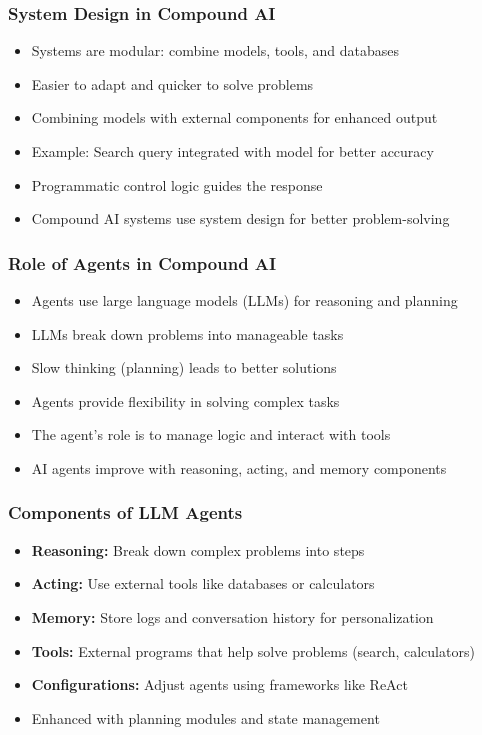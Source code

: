 \begin{frame}[fragile]\frametitle{System Design in Compound AI}
\begin{itemize}
    \item Systems are modular: combine models, tools, and databases
    \item Easier to adapt and quicker to solve problems
    \item Combining models with external components for enhanced output
    \item Example: Search query integrated with model for better accuracy
    \item Programmatic control logic guides the response
    \item Compound AI systems use system design for better problem-solving
\end{itemize}
\end{frame}

\begin{frame}[fragile]\frametitle{Role of Agents in Compound AI}
\begin{itemize}
    \item Agents use large language models (LLMs) for reasoning and planning
    \item LLMs break down problems into manageable tasks
    \item Slow thinking (planning) leads to better solutions
    \item Agents provide flexibility in solving complex tasks
    \item The agent's role is to manage logic and interact with tools
    \item AI agents improve with reasoning, acting, and memory components
\end{itemize}
\end{frame}

\begin{frame}[fragile]\frametitle{Components of LLM Agents}
\begin{itemize}
    \item \textbf{Reasoning:} Break down complex problems into steps
    \item \textbf{Acting:} Use external tools like databases or calculators
    \item \textbf{Memory:} Store logs and conversation history for personalization
    \item \textbf{Tools:} External programs that help solve problems (search, calculators)
    \item \textbf{Configurations:} Adjust agents using frameworks like ReAct
    \item Enhanced with planning modules and state management
\end{itemize}
\end{frame}

